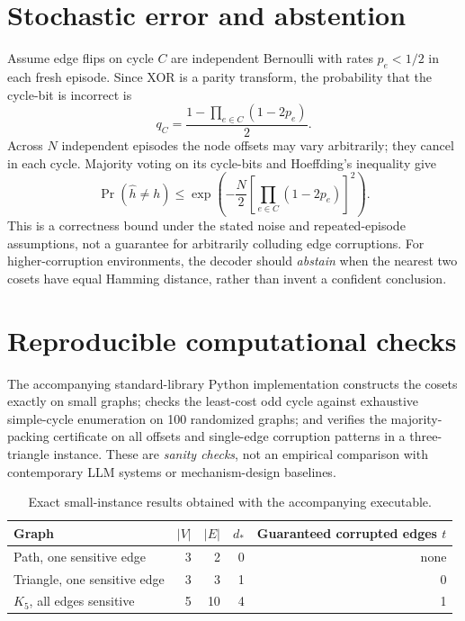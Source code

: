 \documentclass[10pt,a4paper]{article}
\theoremstyle{definition}\newtheorem{definition}[theorem]{Definition}
\begin{document}
\section{Stochastic error and abstention}
Assume edge flips on cycle $C$ are independent Bernoulli with rates $p_e<1/2$ in each fresh episode. Since XOR is a parity transform, the probability that the cycle-bit is incorrect is
\begin{equation}\label{eq:noise}
 q_C=\frac{1-\prod_{e\in C}(1-2p_e)}{2}.
\end{equation}
Across $N$ independent episodes the node offsets may vary arbitrarily; they cancel in each cycle. Majority voting on its cycle-bits and Hoeffding's inequality give
\begin{equation}
 \Pr(\widehat h\ne h)\le\exp\!\left(-\frac{N}{2}\left[\prod_{e\in C}(1-2p_e)\right]^2\right).
\end{equation}
This is a correctness bound under the stated noise and repeated-episode assumptions, not a guarantee for arbitrarily colluding edge corruptions. For higher-corruption environments, the decoder should \emph{abstain} when the nearest two cosets have equal Hamming distance, rather than invent a confident conclusion.

\section{Reproducible computational checks}
The accompanying standard-library Python implementation constructs the cosets exactly on small graphs; checks the least-cost odd cycle against exhaustive simple-cycle enumeration on 100 randomized graphs; and verifies the majority-packing certificate on all offsets and single-edge corruption patterns in a three-triangle instance. These are \emph{sanity checks}, not an empirical comparison with contemporary LLM systems or mechanism-design baselines.

\begin{table}[h]
\centering\small
\caption{Exact small-instance results obtained with the accompanying executable.}
\begin{tabular}{@{}lrrrr@{}}\toprule
Graph & $|V|$ & $|E|$ & $d_*$ & Guaranteed corrupted edges $t$ \\\midrule
Path, one sensitive edge & 3 & 2 & 0 & none \\
Triangle, one sensitive edge & 3 & 3 & 1 & 0 \\
$K_5$, all edges sensitive & 5 & 10 & 4 & 1 \\\bottomrule
\end{tabular}
\end{table}
\end{document}
